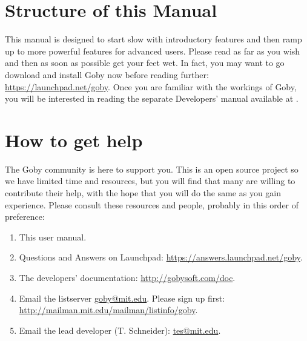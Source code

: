\section{Structure of this Manual}
This manual is designed to start slow with introductory features and then ramp up to more powerful features for advanced users. Please read as far as you wish and then as soon as possible get your feet wet. In fact, you may want to go download and install Goby now before reading further: \url{https://launchpad.net/goby}. Once you are familiar with the workings of Goby, you will be interested in reading the separate Developers' manual available at \cite{goby-doc}.

\section{How to get help}
The Goby community is here to support you. This is an open source project so we have limited time and resources, but you will find that many are willing to contribute their help, with the hope that you will do the same as you gain experience. Please consult these resources and people, probably in this order of preference:

\begin{enumerate}
\item This user manual. %
\item Questions and Answers on Launchpad: \url{https://answers.launchpad.net/goby}.
\item The developers' documentation: \url{http://gobysoft.com/doc}.
\item Email the listserver \href{mailto:goby@mit.edu}{goby@mit.edu}. Please sign up first: \url{http://mailman.mit.edu/mailman/listinfo/goby}.
\item Email the lead developer (T. Schneider): \href{mailto:tes@mit.edu}{tes@mit.edu}.
\end{enumerate}


